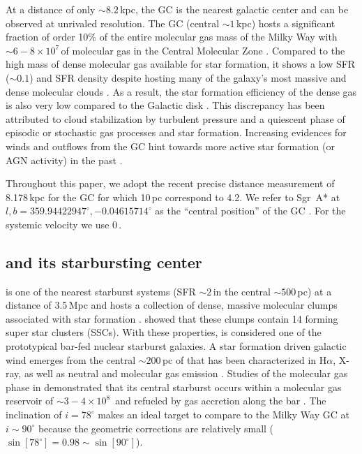 At a distance of only $\sim8.2$\,kpc, the GC is the nearest galactic center and can be observed at unrivaled resolution.
The GC (central $\sim 1$\,kpc) hosts a significant fraction of order 10\% of the entire molecular gas mass of the Milky Way with $\sim 6-8 \times 10^7$\,\Msun of molecular gas in the Central Molecular Zone \citep{1998ApJS..118..455O,Morris:1996db,2007A&A...467..611F}.
Compared to the high mass of dense molecular gas available for star formation, it shows a low SFR ($\sim 0.1$\Msunyr) and SFR density despite hosting many of the galaxy's most massive and dense molecular clouds \citep[e.g.][]{2013MNRAS.429..987L,2017MNRAS.469.2263B}.
As a result, the star formation efficiency of the dense gas is also very low compared to the Galactic disk \citep[e.g.][]{2013MNRAS.429..987L}.
This discrepancy has been attributed to cloud stabilization by turbulent pressure and a quiescent phase of episodic \citep[e.g.][]{2015MNRAS.453..739K,2017MNRAS.466.1213K} or stochastic \citep[e.g.][]{2019MNRAS.484.1213S} gas processes and star formation.
Increasing evidences for winds and outflows from the GC hint towards more active star formation (or AGN activity) in the past \citep[e.g.][]{2019arXiv191106864L,2019MNRAS.482.4813S}.

Throughout this paper, we adopt the recent precise distance measurement of 8.178\,kpc for the GC \citep{2019A&A...625L..10G} for which 10\,pc correspond to 4.2\arcmin.
We refer to Sgr~A* at $l, b = 359.94422947^\circ, -0.04615714^\circ$ as the ``central position'' of the GC \citep{2011AJ....142...35P}. For the systemic velocity we use 0\,\kms.


\subsection{ and its starbursting center}

 is one of the nearest starburst systems (SFR $\sim 2$\,\Msunyr in the central $\sim 500$\,pc) at a distance of 3.5\,Mpc \citep{Rekola:2005ha} and hosts a collection of dense, massive molecular clumps associated with star formation \citep[e.g.][]{Sakamoto:2011et,2017ApJ...849...81A}. \citet{2018ApJ...869..126L} showed that these clumps contain 14 forming super star clusters (SSCs). With these properties,  is considered one of the prototypical bar-fed nuclear starburst galaxies.
A star formation driven galactic wind emerges from the central $\sim 200$\,pc of  that has been characterized in H$\alpha$, X-ray, as well as neutral and molecular gas emission \citep[e.g.][]{Sharp:2010jl,Turner:1985iy,Sturm:2011jb,Strickland:2000wd,Strickland:2002kp, Westmoquette:2011bp,2000ApJS..129..493H,2013Natur.499..450B,2017ApJ...835..265W,2019ApJ...881...43K,2006ApJ...636..685S}. 
Studies of the molecular gas phase in  demonstrated that its central starburst occurs within a molecular gas reservoir of $\sim 3-4 \times 10^8$\,\Msun \citep{1996A&A...305..421M,Leroy:2015ds,2018ApJ...860...23P,2019ApJ...881...43K} and refueled by gas accretion along the bar \citep{2004ApJ...611..835P}.
The inclination of $i = 78^\circ$ makes  an ideal target to compare to the Milky Way GC at $i \sim 90^\circ$ because the geometric corrections are relatively small ($\sin [78^\circ] = 0.98 \sim \sin [90^\circ]$).

